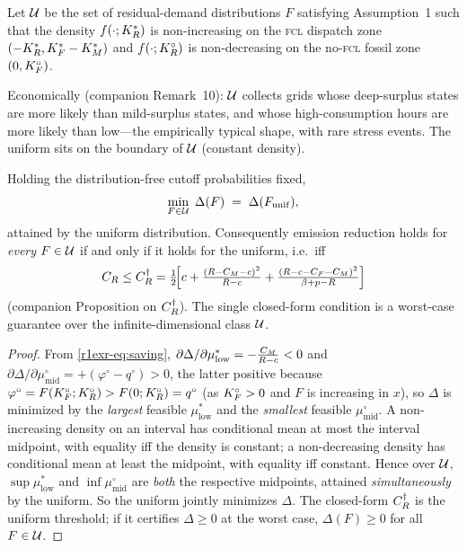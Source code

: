 \begin{definition}\label{r1exr-def:U}
Let $\mathcal U$ be the set of residual-demand distributions $F$ satisfying
Assumption~1 such that the density $f(\cdot;K_R^{*})$ is non-increasing on the
\textsc{fcl} dispatch zone $(-K_R^{*},K_F^{*}-K_M^{*})$ and $f(\cdot;K_R^{\circ})$ is
non-decreasing on the no-\textsc{fcl} fossil zone $(0,K_F^{\circ})$.
\end{definition}

Economically (companion Remark~10): $\mathcal U$ collects grids whose deep-surplus
states are more likely than mild-surplus states, and whose high-consumption hours
are more likely than low---the empirically typical shape, with rare stress events.
The uniform sits on the boundary of $\mathcal U$ (constant density).

\begin{theorem}\label{r1exr-thm:robust}
Holding the distribution-free cutoff probabilities fixed,
\[
  \min_{F\in\mathcal U}\;\Delta(F)\;=\;\Delta(F_{\mathrm{unif}}),
\]
attained by the uniform distribution. Consequently emission reduction holds for
\emph{every} $F\in\mathcal U$ if and only if it holds for the uniform, i.e.\ iff
\[
  C_R\le C_R^{\dagger}
  =\tfrac12\!\Big[c+\tfrac{(R-C_M-c)^2}{R-c}+\tfrac{(R-c-C_F-C_M)^2}{\beta+p-R}\Big]
\]
(companion Proposition on $C_R^{\dagger}$). The single closed-form condition is a
worst-case guarantee over the infinite-dimensional class $\mathcal U$.
\end{theorem}

\begin{proof}
From \eqref{r1exr-eq:saving},
$\partial\Delta/\partial\mu^{*}_{\mathrm{low}}=-\tfrac{C_M}{R-c}<0$ and
$\partial\Delta/\partial\mu^{\circ}_{\mathrm{mid}}=+(\varphi^{\circ}-q^{\circ})>0$,
the latter positive because $\varphi^{\circ}=F(K_F^{\circ};K_R^{\circ})>F(0;K_R^{\circ})=q^{\circ}$ (as
$K_F^{\circ}>0$ and $F$ is increasing in $x$),
so $\Delta$ is minimized by the \emph{largest} feasible $\mu^{*}_{\mathrm{low}}$
and the \emph{smallest} feasible $\mu^{\circ}_{\mathrm{mid}}$. A non-increasing
density on an interval has conditional mean at most the interval midpoint, with
equality iff the density is constant; a non-decreasing density has conditional
mean at least the midpoint, with equality iff constant. Hence over $\mathcal U$,
$\sup\mu^{*}_{\mathrm{low}}$ and $\inf\mu^{\circ}_{\mathrm{mid}}$ are \emph{both}
the respective midpoints, attained \emph{simultaneously} by the uniform. So the
uniform jointly minimizes $\Delta$. The closed-form $C_R^{\dagger}$ is the uniform
threshold; if it certifies $\Delta\ge0$ at the worst case, $\Delta(F)\ge0$ for all
$F\in\mathcal U$.
\end{proof}

